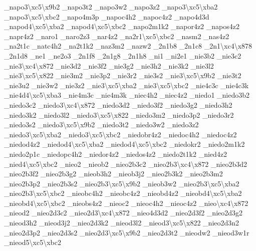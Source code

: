 {\-\_\-napo3\textbackslash{}xc5\textbackslash{}x9b2 \-\_\-napo3t2 \-\_\-napo3w2 \-\_\-napo3z2 \-\_\-napo3\textbackslash{}xc5\textbackslash{}xba2 \-\_\-napo3\textbackslash{}xc5\textbackslash{}xbc2 \-\_\-napo4m3p \-\_\-napoc4h2 \-\_\-napoc4z2 \-\_\-napo4d3d \-\_\-napod4\textbackslash{}xc5\textbackslash{}xba2 \-\_\-napod4\textbackslash{}xc5\textbackslash{}xbc2 \-\_\-napo2m1k2 \-\_\-napor4z2 \-\_\-napos4z2 \-\_\-napr4z2 \-\_\-naro1 \-\_\-naro2z3 \-\_\-nar4z2 \-\_\-na2r1\textbackslash{}xc5\textbackslash{}xbc2 \-\_\-nasm2 \-\_\-nas4z2 \-\_\-na2t1c \-\_\-natc4h2 \-\_\-na2t1k2 \-\_\-naz3m2 \-\_\-nazw2 \-\_\-2n1b8 \-\_\-2n1c8 \-\_\-2n1\textbackslash{}xc4\textbackslash{}x878 \-\_\-2n1d8 \-\_\-ne1 \-\_\-ne2o3 \-\_\-2n1f8 \-\_\-2n1g8 \-\_\-2n1h8 \-\_\-ni1 \-\_\-ni2e1 \-\_\-nie3b2 \-\_\-nie3c2 \-\_\-nie3\textbackslash{}xc4\textbackslash{}x872 \-\_\-nie3d2 \-\_\-nie3f2 \-\_\-nie3g2 \-\_\-nie3h2 \-\_\-nie3k2 \-\_\-nie3l2 \-\_\-nie3\textbackslash{}xc5\textbackslash{}x822 \-\_\-nie3m2 \-\_\-nie3p2 \-\_\-nie3r2 \-\_\-nie3s2 \-\_\-nie3\textbackslash{}xc5\textbackslash{}x9b2 \-\_\-nie3t2 \-\_\-nie3u2 \-\_\-nie3w2 \-\_\-nie3z2 \-\_\-nie3\textbackslash{}xc5\textbackslash{}xba2 \-\_\-nie3\textbackslash{}xc5\textbackslash{}xbc2 \-\_\-nie4c3c \-\_\-nie4c3k \-\_\-nie4d4\textbackslash{}xc5\textbackslash{}xba3 \-\_\-nie4m3c \-\_\-nie4m3k \-\_\-niec4h2 \-\_\-niec4z2 \-\_\-niedo1 \-\_\-niedo3b2 \-\_\-niedo3c2 \-\_\-niedo3\textbackslash{}xc4\textbackslash{}x872 \-\_\-niedo3d2 \-\_\-niedo3f2 \-\_\-niedo3g2 \-\_\-niedo3h2 \-\_\-niedo3k2 \-\_\-niedo3l2 \-\_\-niedo3\textbackslash{}xc5\textbackslash{}x822 \-\_\-niedo3m2 \-\_\-niedo3p2 \-\_\-niedo3r2 \-\_\-niedo3s2 \-\_\-niedo3\textbackslash{}xc5\textbackslash{}x9b2 \-\_\-niedo3t2 \-\_\-niedo3w2 \-\_\-niedo3z2 \-\_\-niedo3\textbackslash{}xc5\textbackslash{}xba2 \-\_\-niedo3\textbackslash{}xc5\textbackslash{}xbc2 \-\_\-niedobr4z2 \-\_\-niedoc4h2 \-\_\-niedoc4z2 \-\_\-niedod4z2 \-\_\-niedod4\textbackslash{}xc5\textbackslash{}xba2 \-\_\-niedod4\textbackslash{}xc5\textbackslash{}xbc2 \-\_\-niedokr2 \-\_\-niedo2m1k2 \-\_\-niedo2p1c \-\_\-niedopc4h2 \-\_\-niedor4z2 \-\_\-niedos4z2 \-\_\-niedo2t1k2 \-\_\-nied4z2 \-\_\-nied4\textbackslash{}xc5\textbackslash{}xbc2 \-\_\-nieo2 \-\_\-nieob2 \-\_\-nieo2b3c2 \-\_\-nieo2b3\textbackslash{}xc4\textbackslash{}x872 \-\_\-nieo2b3d2 \-\_\-nieo2b3f2 \-\_\-nieo2b3g2 \-\_\-nieob3h2 \-\_\-nieob3j2 \-\_\-nieo2b3k2 \-\_\-nieo2b3m2 \-\_\-nieo2b3p2 \-\_\-nieo2b3s2 \-\_\-nieo2b3\textbackslash{}xc5\textbackslash{}x9b2 \-\_\-nieob3w2 \-\_\-nieo2b3\textbackslash{}xc5\textbackslash{}xba2 \-\_\-nieo2b3\textbackslash{}xc5\textbackslash{}xbc2 \-\_\-nieobc4h2 \-\_\-nieobc4z2 \-\_\-nieobd4z2 \-\_\-nieobd4\textbackslash{}xc5\textbackslash{}xba2 \-\_\-nieobd4\textbackslash{}xc5\textbackslash{}xbc2 \-\_\-nieobs4z2 \-\_\-nieoc2 \-\_\-nieoc4h2 \-\_\-nieoc4z2 \-\_\-nieo\textbackslash{}xc4\textbackslash{}x872 \-\_\-nieod2 \-\_\-nieo2d3c2 \-\_\-nieo2d3\textbackslash{}xc4\textbackslash{}x872 \-\_\-nieo4d3d2 \-\_\-nieo2d3f2 \-\_\-nieo2d3g2 \-\_\-nieod3h2 \-\_\-nieod3j2 \-\_\-nieo2d3k2 \-\_\-nieod3l2 \-\_\-nieod3\textbackslash{}xc5\textbackslash{}x822 \-\_\-nieo2d3n2 \-\_\-nieo2d3p2 \-\_\-nieo2d3s2 \-\_\-nieo2d3\textbackslash{}xc5\textbackslash{}x9b2 \-\_\-nieo2d3t2 \-\_\-nieodw2 \-\_\-nieod3w1r \-\_\-nieod5\textbackslash{}xc5\textbackslash{}xbc2 }
